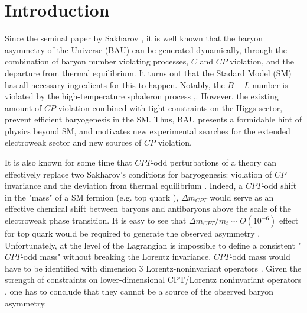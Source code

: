 \documentclass[12pt]{revtex4}
\begin{document}
%
%
\section{Introduction}
\label{intro}

%
%
%
%
%
%

Since the seminal paper by Sakharov \cite{Sakharov:1967dj}, it is well known that the 
baryon asymmetry of the Universe (BAU) can be generated dynamically, through the 
combination of baryon number violating processes, $C$ and $CP$ violation, and the 
departure from thermal equilibrium. It turns out that the Stadard Model (SM) has all necessary  
ingredients for this to happen. Notably, the $B+L$ number is violated by the 
high-temperature sphaleron process \cite{Klinkhamer:1984di},\cite{Kuzmin:1985mm}. However, the 
existing amount of $CP$-violation combined with tight constraints on the Higgs sector,
prevent efficient baryogenesis in the SM. Thus, BAU presents a formidable hint of physics 
beyond SM, and motivates new experimental searches for the extended 
electroweak sector and new sources of $CP$ violation. 


	It is also known for some time that $CPT$-odd perturbations of a theory can effectively
	replace two Sakharov's conditions for baryogenesis: violation of $CP$
	invariance and the deviation from thermal equilibrium \cite{Dolgov:1981hv}.
	Indeed, a $CPT$-odd shift in the "mass" of a SM fermion (e.g. top quark \cite{Dolgov:1991fr}), 
    $\Delta m_{CPT}$ 
    would serve as an effective chemical shift between baryons and antibaryons above the 
    scale of the electroweak phase transition. 
    It is easy to see that $\Delta m_{CPT}/m_t\sim O(10^{-6})$ effect for top quark would be required to generate the 
    observed asymmetry  \cite{Dolgov:1991fr}. Unfortunately, at the level of the Lagrangian 
    is impossible to define a consistent 
    "$CPT$-odd mass" without breaking the Lorentz invariance.  $CPT$-odd mass would have to be identified 
with dimension 3 Lorentz-noninvariant operators \cite{Kost1}. Given the strength of
	constraints on lower-dimensional CPT/Lorentz noninvariant operators \cite{Colladay:1998fq}, one 
	has to conclude that they cannot be a source of the observed baryon asymmetry. 
\end{document}
